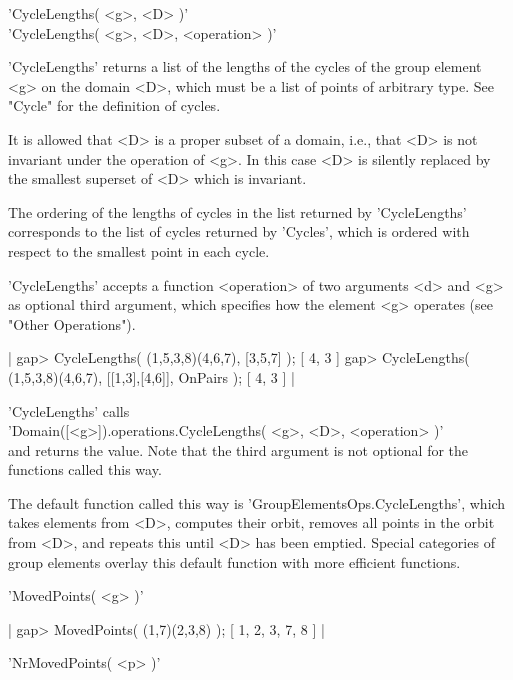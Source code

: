 
'CycleLengths( <g>, <D> )' \\
'CycleLengths( <g>, <D>, <operation> )'

'CycleLengths' returns a list of the  lengths of the  cycles of the group
element   <g> on  the domain  <D>,   which must be   a  list of points of
arbitrary type.  See "Cycle" for the definition of cycles.

It is allowed that <D> is a proper subset of a domain, i.e., that  <D> is
not invariant under the  operation of <g>.   In this case <D> is silently
replaced by the smallest superset of <D> which is invariant.

The  ordering  of   the lengths  of   cycles   in  the  list  returned by
'CycleLengths' corresponds  to the list  of cycles returned  by 'Cycles',
which is ordered with respect to the smallest point in each cycle.

'CycleLengths' accepts  a function <operation>  of two arguments  <d> and
<g>  as   optional third argument, which  specifies   how the element <g>
operates (see "Other Operations").

|    gap> CycleLengths( (1,5,3,8)(4,6,7), [3,5,7] );
    [ 4, 3 ]
    gap> CycleLengths( (1,5,3,8)(4,6,7), [[1,3],[4,6]], OnPairs );
    [ 4, 3 ] |

'CycleLengths' calls \\
'Domain([<g>]).operations.CycleLengths( <g>, <D>, <operation> )' \\
and returns the value.  Note that the  third argument is not optional for
the functions called this way.

The default function called  this way is 'GroupElementsOps.CycleLengths',
which takes elements  from <D>, computes  their orbit, removes all points
in the orbit from <D>,  and repeats  this   until  <D> has been  emptied.
Special categories of group elements  overlay  this default function with
more efficient functions.


'MovedPoints( <g> )'


|    gap> MovedPoints( (1,7)(2,3,8) );
    [ 1, 2, 3, 7, 8 ] |


'NrMovedPoints( <p> )'

